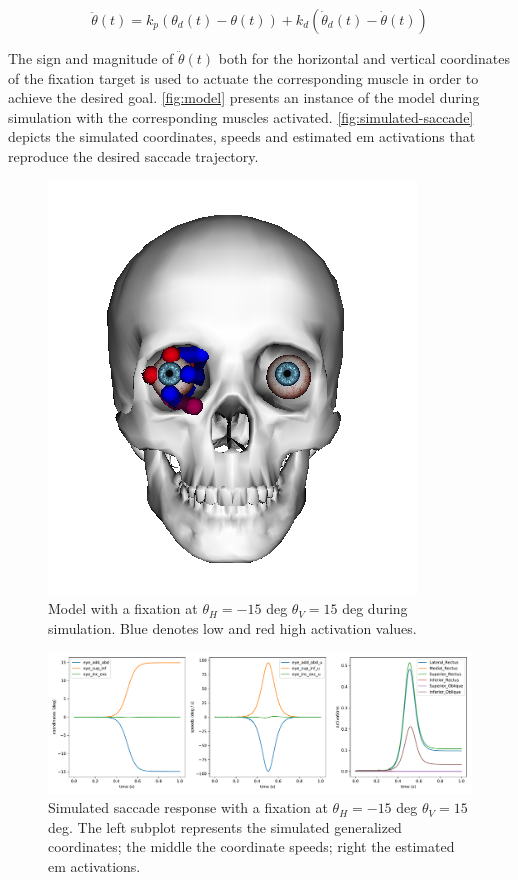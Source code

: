 \documentclass[11pt,a4paper,draft=false]{report}
\begin{document}
\begin{equation}\label{equ:pd-controller}
  \ddot{\theta}(t) = k_p (\theta_d(t) - \theta(t)) + k_d (\dot{\theta}_d(t) -
  \dot{\theta}(t)) 
\end{equation}

The sign and magnitude of $\ddot{\theta}(t)$ both for the horizontal and
vertical coordinates of the fixation target is used to actuate the corresponding
muscle in order to achieve the desired goal. \autoref{fig:model} presents an
instance of the model during simulation with the corresponding muscles
activated. \autoref{fig:simulated-saccade} depicts the simulated coordinates,
speeds and estimated \gls{em} activations that reproduce the desired saccade
trajectory.

\begin{figure}[ht]
  \centering
  \includegraphics[width=.6\textwidth]{model.png}
  \caption{Model with a fixation at $\theta_H = -15$ deg $\theta_V = 15$ deg
    during simulation. Blue denotes low and red high activation
    values.}\label{fig:model}
\end{figure}

\begin{figure}[ht]
  \centering
  \includegraphics[width=1.\textwidth]{UPAT_Eye_Model_Passive_Pulleys_v3_States[-15][15].pdf}
  \caption{Simulated saccade response with a fixation at $\theta_H = -15$ deg
    $\theta_V = 15$ deg. The left subplot represents the simulated generalized
    coordinates; the middle the coordinate speeds; right the estimated \gls{em}
    activations.}\label{fig:simulated-saccade}
\end{figure}
\end{document}
